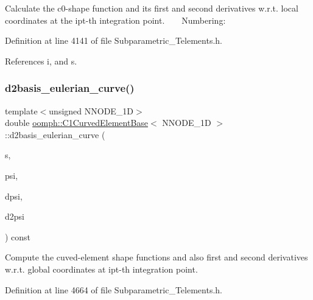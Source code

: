 Calculate the c0-\/shape function and its first and second derivatives w.\+r.\+t. local coordinates at the ipt-\/th integration point. ~\newline
~\newline
 Numbering\+: 

Definition at line 4141 of file Subparametric\+\_\+\+Telements.\+h.



References i, and s.

\mbox{\label{classoomph_1_1C1CurvedElementBase_aca6c4b025f8368574a277266d3b9ae14}} 
\subsubsection{\texorpdfstring{d2basis\+\_\+eulerian\+\_\+curve()}{d2basis\_eulerian\_curve()}}
{\footnotesize\ttfamily template$<$unsigned N\+N\+O\+D\+E\+\_\+1D$>$ \\
double \hyperlink{classoomph_1_1C1CurvedElementBase}{oomph\+::\+C1\+Curved\+Element\+Base}$<$ N\+N\+O\+D\+E\+\_\+1D $>$\+::d2basis\+\_\+eulerian\+\_\+curve (\begin{DoxyParamCaption}\item[{const \hyperlink{classoomph_1_1Vector}{Vector}$<$ double $>$ \&}]{s,  }\item[{\hyperlink{classoomph_1_1Shape}{Shape} \&}]{psi,  }\item[{\hyperlink{classoomph_1_1DShape}{D\+Shape} \&}]{dpsi,  }\item[{\hyperlink{classoomph_1_1DShape}{D\+Shape} \&}]{d2psi }\end{DoxyParamCaption}) const\hspace{0.3cm}{\ttfamily [inline]}}



Compute the cuved-\/element shape functions and also first and second derivatives w.\+r.\+t. global coordinates at ipt-\/th integration point. 



Definition at line 4664 of file Subparametric\+\_\+\+Telements.\+h.

\mbox{\label{classoomph_1_1C1CurvedElementBase_a3062f4ef25e52d39a9b9ced665a361d0}} 

